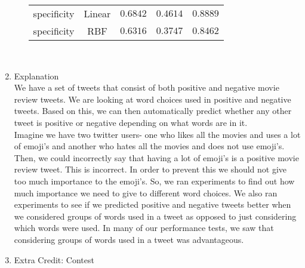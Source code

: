 \documentclass[11pt]{article}
\begin{document}
\begin{enumerate}
\begin{enumerate}[(a)]
\begin{tabular}{| c | c | c | c | c |}
specificity & Linear & $0.6842$ & $0.4614$ & $0.8889$ \\
specificity & RBF & $0.6316$ & $0.3747$ & $0.8462$ \\
\hline
\end{tabular} \\
\end{enumerate}
\item Explanation \\
We have a set of tweets that consist of both positive and negative movie review tweets. We are looking at word choices used in positive and negative tweets. Based on this, we can then automatically predict whether any other tweet is positive or negative depending on what words are in it. \\
Imagine we have two twitter users- one who likes all the movies and uses a lot of emoji's and another who hates all the movies and does not use emoji's. Then, we could incorrectly say that having a lot of emoji's is a positive movie review tweet. This is incorrect. In order to prevent this we should not give too much importance to the emoji's. So, we ran experiments to find out how much importance we need to give to different word choices. 
We also ran experiments to see if we predicted positive and negative tweets better when we considered groups of words used in a tweet as opposed to just considering which words were used. In many of our performance tests, we saw that considering groups of words used in a tweet was advantageous. 
\item Extra Credit: Contest
\end{enumerate}
\end{document}
